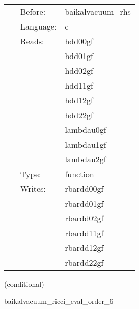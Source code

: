 \hspace{5mm}{\it compute ricci tensor, needed for bssn rhss, at finite-differencing order 4 } 


\hspace{5mm}

 \begin{tabular*}{160mm}{cll} 
~ & Before:  & baikalvacuum\_rhs \\ 
~ & Language:  & c \\ 
~ & Reads:  & hdd00gf \\ 
~& ~ &hdd01gf\\ 
~& ~ &hdd02gf\\ 
~& ~ &hdd11gf\\ 
~& ~ &hdd12gf\\ 
~& ~ &hdd22gf\\ 
~& ~ &lambdau0gf\\ 
~& ~ &lambdau1gf\\ 
~& ~ &lambdau2gf\\ 
~ & Type:  & function \\ 
~ & Writes:  & rbardd00gf \\ 
~& ~ &rbardd01gf\\ 
~& ~ &rbardd02gf\\ 
~& ~ &rbardd11gf\\ 
~& ~ &rbardd12gf\\ 
~& ~ &rbardd22gf\\ 
\end{tabular*} 


\vspace{5mm}

   (conditional) 

\hspace{5mm} baikalvacuum\_ricci\_eval\_order\_6 

\hspace{5mm}{\it compute ricci tensor, needed for bssn rhss, at finite-differencing order 6 } 


\hspace{5mm}

